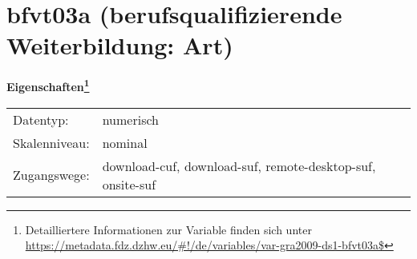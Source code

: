 
    \setcounter{footnote}{0}

    \vspace*{-1.8cm}
	\section{bfvt03a (berufsqualifizierende Weiterbildung: Art)}
	\label{section:bfvt03a}



    \vspace*{0.5cm}
    \noindent\textbf{Eigenschaften\footnote{Detailliertere Informationen zur Variable finden sich unter
		\url{https://metadata.fdz.dzhw.eu/\#!/de/variables/var-gra2009-ds1-bfvt03a$}}}\\
	\begin{tabularx}{\hsize}{@{}lX}
	Datentyp: & numerisch \\
	Skalenniveau: & nominal \\
	Zugangswege: &
	  download-cuf, 
	  download-suf, 
	  remote-desktop-suf, 
	  onsite-suf
 \\
    \end{tabularx}



